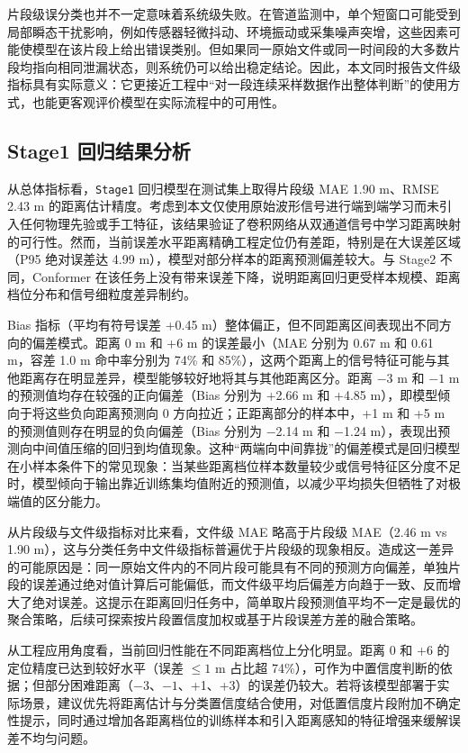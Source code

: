 片段级误分类也并不一定意味着系统级失败。在管道监测中，单个短窗口可能受到局部瞬态干扰影响，例如传感器轻微抖动、环境振动或采集噪声突增，这些因素可能使模型在该片段上给出错误类别。但如果同一原始文件或同一时间段的大多数片段均指向相同泄漏状态，则系统仍可以给出稳定结论。因此，本文同时报告文件级指标具有实际意义：它更接近工程中“对一段连续采样数据作出整体判断”的使用方式，也能更客观评价模型在实际流程中的可用性。

\subsection{Stage1 回归结果分析}

从总体指标看，\texttt{Stage1} 回归模型在测试集上取得片段级 MAE 1.90 m、RMSE 2.43 m 的距离估计精度。考虑到本文仅使用原始波形信号进行端到端学习而未引入任何物理先验或手工特征，该结果验证了卷积网络从双通道信号中学习距离映射的可行性。然而，当前误差水平距离精确工程定位仍有差距，特别是在大误差区域（P95 绝对误差达 4.99 m），模型对部分样本的距离预测偏差较大。与 Stage2 不同，Conformer 在该任务上没有带来误差下降，说明距离回归更受样本规模、距离档位分布和信号细粒度差异制约。

Bias 指标（平均有符号误差 +0.45 m）整体偏正，但不同距离区间表现出不同方向的偏差模式。距离 0 m 和 +6 m 的误差最小（MAE 分别为 0.67 m 和 0.61 m，容差 1.0 m 命中率分别为 74\% 和 85\%），这两个距离上的信号特征可能与其他距离存在明显差异，模型能够较好地将其与其他距离区分。距离 $-3$ m 和 $-1$ m 的预测值均存在较强的正向偏差（Bias 分别为 +2.66 m 和 +4.85 m），即模型倾向于将这些负向距离预测向 0 方向拉近；正距离部分的样本中，+1 m 和 +5 m 的预测值则存在明显的负向偏差（Bias 分别为 $-$2.14 m 和 $-$1.24 m），表现出预测向中间值压缩的回归到均值现象。这种“两端向中间靠拢”的偏差模式是回归模型在小样本条件下的常见现象：当某些距离档位样本数量较少或信号特征区分度不足时，模型倾向于输出靠近训练集均值附近的预测值，以减少平均损失但牺牲了对极端值的区分能力。

从片段级与文件级指标对比来看，文件级 MAE 略高于片段级 MAE（2.46 m vs 1.90 m），这与分类任务中文件级指标普遍优于片段级的现象相反。造成这一差异的可能原因是：同一原始文件内的不同片段可能具有不同的预测方向偏差，单独片段的误差通过绝对值计算后可能偏低，而文件级平均后偏差方向趋于一致、反而增大了绝对误差。这提示在距离回归任务中，简单取片段预测值平均不一定是最优的聚合策略，后续可探索按片段置信度加权或基于片段误差方差的融合策略。

从工程应用角度看，当前回归性能在不同距离档位上分化明显。距离 0 和 +6 的定位精度已达到较好水平（误差 $\leq 1$ m 占比超 74\%），可作为中置信度判断的依据；但部分困难距离（$-3$、$-1$、+1、+3）的误差仍较大。若将该模型部署于实际场景，建议优先将距离估计与分类置信度结合使用，对低置信度片段附加不确定性提示，同时通过增加各距离档位的训练样本和引入距离感知的特征增强来缓解误差不均匀问题。

